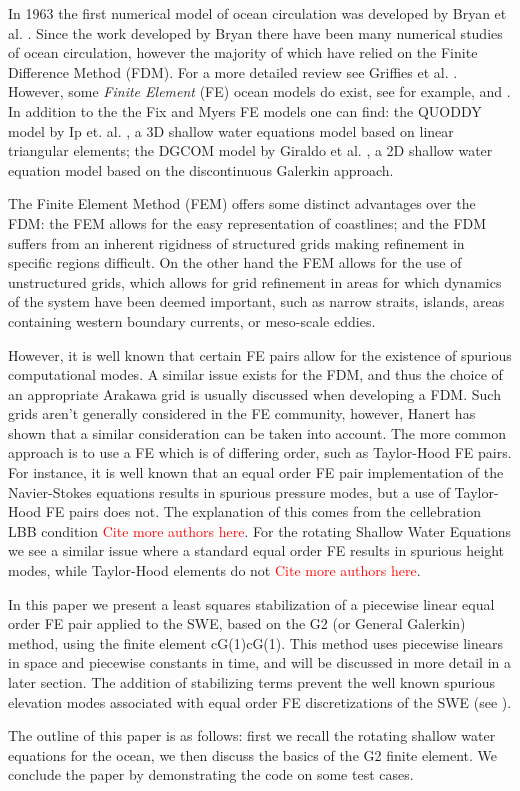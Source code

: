 In 1963 the first numerical model of ocean circulation was developed by Bryan et
al.  \cite{Bryan1963}. Since the work developed by Bryan there have been many
numerical studies of ocean circulation, however the majority of which have
relied on the Finite Difference Method (FDM). For a more detailed review see
Griffies et al. \cite{Griffies2000}. However, some \emph{Finite Element} (FE)
ocean models do exist, see for example, \cite{Fix} and \cite{Myers}. In addition
to the the Fix and Myers FE models one can find: the QUODDY model by Ip et. al.
\cite{Ip1995}, a 3D shallow water equations model based on linear triangular
elements; the DGCOM model by Giraldo et al. \cite{GiraldoWWW}, a 2D shallow
water equation model based on the discontinuous Galerkin approach.

The Finite Element Method (FEM) offers some distinct advantages over the FDM:
the FEM allows for the easy representation of coastlines; and the FDM suffers
from an inherent rigidness of structured grids making refinement in specific
regions difficult. On the other hand the FEM allows for the use of unstructured
grids, which allows for grid refinement in areas for which dynamics of the
system have been deemed important, such as narrow straits, islands, areas
containing western boundary currents, or meso-scale eddies.

However, it is well known that certain FE pairs allow for the existence of
spurious computational modes. A similar issue exists for the FDM, and thus the
choice of an appropriate Arakawa grid is usually discussed when developing a
FDM. Such grids aren't generally considered in the FE community, however, Hanert
\cite{Hanert2004} has shown that a similar consideration can be taken into
account. The more common approach is to use a FE which is of differing order,
such as Taylor-Hood FE pairs. For instance, it is well known that an equal order
FE pair implementation of the Navier-Stokes equations results in spurious
pressure modes, but a use of Taylor-Hood FE pairs does not. The explanation of
this comes from the cellebration LBB condition \cite{Johnson2009}
\textcolor{red}{Cite more authors here}. For the rotating Shallow Water
Equations we see a similar issue where a standard equal order FE results in
spurious height modes, while Taylor-Hood elements do not \cite{Hanert2004}
\textcolor{red}{Cite more authors here}.

In this paper we present a least squares stabilization of a piecewise linear
equal order FE pair applied to the SWE, based on the G2 (or General Galerkin)
method, using the finite element cG(1)cG(1). This method uses piecewise linears
in space and piecewise constants in time, and will be discussed in more detail
in a later section. The addition of stabilizing terms prevent the well known
spurious elevation modes associated with equal order FE discretizations of
the SWE (see \cite{Hanert2002,Hanert2006,Le-Roux2005}).

The outline of this paper is as follows: first we recall the rotating shallow
water equations for the ocean, we then discuss the basics of the G2 finite
element. We conclude the paper by demonstrating the code on some test cases.
